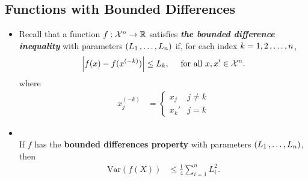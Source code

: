 \documentclass[11pt]{article}
\begin{document}
\subsection{Functions with Bounded Differences}
\begin{itemize}
\item \begin{remark}
Recall that a function $f: {\mathcal X}^n \to {\mathbb R}$ satisfies \textbf{\emph{the bounded difference inequality}} with parameters $(L_1 \,{,}\ldots{,}\, L_n)$ if, for each index $k = 1, 2 \,{,}\ldots{,}\, n$,
\begin{align*}
\left\lvert f(x) - f(x^{(-k)}) \right\rvert \le L_k, \quad\text{ for all }x, x' \in {\mathcal X}^n. 
\end{align*} where 
\begin{align*}
x_j^{(-k)} &= \left\{\begin{array}{cc}
x_j & j \neq k\\
x_k'& j = k
\end{array}
\right.
\end{align*}
\end{remark}

\item \begin{corollary} \citep{boucheron2013concentration}\\
If $f$ has the \textbf{bounded differences property} with parameters $(L_1 \,{,}\ldots{,}\, L_n)$, then
\begin{align*}
\text{Var}(f(X)) &\le \frac{1}{4}\sum_{i=1}^{n}L_i^2.
\end{align*}
\end{corollary}
\end{itemize}
\end{document}
